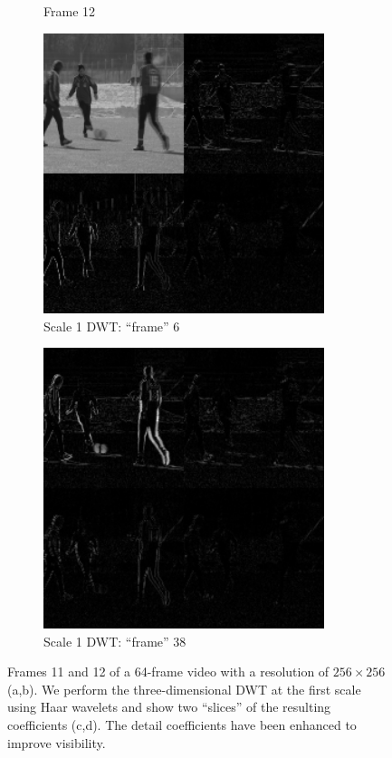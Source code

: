 \begin{figure}
\begin{subfigure}{0.35\textwidth}
    \caption{Frame 12}
  \end{subfigure}
  \begin{subfigure}{0.35\textwidth}
    \includegraphics[width=0.9\textwidth]{Chapter3/Images/dwt_6.png}
    \caption{Scale 1 DWT: ``frame'' 6}
  \end{subfigure}
  \begin{subfigure}{0.35\textwidth}
    \includegraphics[width=0.9\textwidth]{Chapter3/Images/dwt_38.png}
    \caption{Scale 1 DWT: ``frame'' 38}
  \end{subfigure}
  \caption{Frames 11 and 12 of a 64-frame video with a resolution of $256\times 256$ (a,b).
    We perform the three-dimensional DWT at the first scale using Haar wavelets and show two ``slices'' of the resulting coefficients (c,d). The detail coefficients have been enhanced to improve visibility.}
 \label{fig:3d_dwt}
\end{figure}

